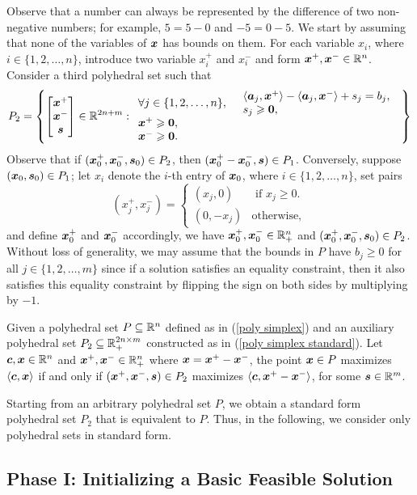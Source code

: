 Observe that a number can always be represented by the difference of two non-negative numbers; for example, $ 5 = 5 -0 $ and $-5 = 0 - 5$. We start by assuming that none of the variables of ${\boldsymbol x}$ has bounds on them. For each variable $x_i$, where $i\in\{1, 2, \dots, n\}$, introduce two variable $x^+_i$ and $x^-_i$ and form ${\boldsymbol x}^+, {\boldsymbol x}^- \in \mathbb R^n$. Consider a third polyhedral set such that 
\begin{equation}\label{poly simplex standard}
P_2 = \left\{ \begin{bmatrix} {\boldsymbol x}^+ \\ {\boldsymbol x}^- \\ {\boldsymbol s}  \end{bmatrix} \in \mathbb R^{2n + m} : 
\begin{array}{ll}
 \forall j\in\{1, 2, \dots, n\}, &  
\begin{array}{l}
\left\langle{\boldsymbol a}_j, {\boldsymbol x}^+\right\rangle - \left\langle{\boldsymbol a}_j, {\boldsymbol x}^-\right\rangle + s_j   = b_j, \\
s_j \geqslant \boldsymbol0, 
\end{array}
\\
 {\boldsymbol x}^+ \geqslant \boldsymbol0, & \\ 
 {\boldsymbol x}^- \geqslant \boldsymbol0. & \\
\end{array}
\right\}
\end{equation}
Observe that if $({\boldsymbol x}^+_0, {\boldsymbol x}^-_0, {\boldsymbol s}_0) \in P_2$, then $({\boldsymbol x}^+_0 - {\boldsymbol x}^-_0, \boldsymbol s) \in P_1$. Conversely, suppose $({\boldsymbol x}_0, \boldsymbol s_0) \in P_1$; let $x_i$ denote the $i$-th entry of ${\boldsymbol x}_0$, where $i\in\{1,2,\dots,n\}$, set pairs 
\[ (x_j^+, x_j^-) = \left\{ \begin{array}{ll} 
(x_j, 0) & \text{ if $x_j\geq 0$. } \\ 
(0, -x_j) & \text{otherwise,}
\end{array}\right. \]
and define ${\boldsymbol x}^+_0$ and ${\boldsymbol x}^-_0$ accordingly, we have ${\boldsymbol x}^+_0, {\boldsymbol x}^-_0 \in \mathbb R^n_+$ and $({\boldsymbol x}^+_0, {\boldsymbol x}^-_0, {\boldsymbol s}_0) \in P_2$. 
Without loss of generality, we may assume that the bounds in $P$ have $b_j \geq 0$ for all $j\in \{1, 2, \dots, m\}$ since if a solution satisfies an equality constraint, then it also satisfies this equality constraint by flipping the sign on both sides by multiplying by $-1$. 

\begin{theorem}
Given a polyhedral set $P\subseteq \mathbb R^n$ defined as in (\ref{poly simplex}) and an auxiliary polyhedral set $P_2 \subseteq \mathbb R^{2n \times m}_+$ constructed as in (\ref{poly simplex standard}). Let ${\boldsymbol c}, {\boldsymbol x} \in \mathbb R^n$ and ${\boldsymbol x}^+, {\boldsymbol x}^- \in \mathbb R^n_+$ where ${\boldsymbol x} = {\boldsymbol x}^+ - {\boldsymbol x}^-$, the point ${\boldsymbol x} \in P$ maximizes $\left\langle{\boldsymbol c}, {\boldsymbol x}\right\rangle$ if and only if $({\boldsymbol x}^+, {\boldsymbol x}^-, {\boldsymbol s}) \in P_2$ maximizes $\left\langle{\boldsymbol c}, {\boldsymbol x}^+ - {\boldsymbol x}^-\right\rangle$, for some ${\boldsymbol s} \in \mathbb R^m$.  \hfill\qedsymbol
\end{theorem}

Starting from an arbitrary polyhedral set $P$, we obtain a standard form polyhedral set $P_2$ that is equivalent to $P$. Thus, in the following, we consider only polyhedral sets in standard form. 


\subsection{Phase I: Initializing a Basic Feasible Solution}




